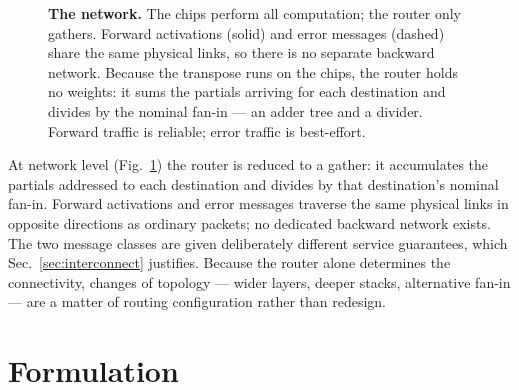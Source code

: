 \documentclass[11pt]{article}
\newcommand{\bdelta}{\bm\delta}
\begin{document}
\begin{figure}[t]
\centering
{}
\caption{\textbf{The network.} The chips perform all computation; the router only gathers. Forward
activations (solid) and error messages (dashed) share the same physical links, so there is no
separate backward network. Because the transpose runs on the chips, the router holds no weights: it
sums the partials arriving for each destination and divides by the nominal fan-in --- an adder tree
and a divider. Forward traffic is reliable; error traffic is best-effort.}
\label{fig:net}
\end{figure}

At network level (Fig.~\ref{fig:net}) the router is reduced to a gather: it accumulates the partials
addressed to each destination and divides by that destination's nominal fan-in. Forward activations
and error messages traverse the same physical links in opposite directions as ordinary packets; no
dedicated backward network exists. The two message classes are given deliberately different service
guarantees, which Sec.~\ref{sec:interconnect} justifies. Because the router alone determines the
connectivity, changes of topology --- wider layers, deeper stacks, alternative fan-in --- are a matter
of routing configuration rather than redesign.

\section{Formulation}\label{sec:theory}
\end{document}
